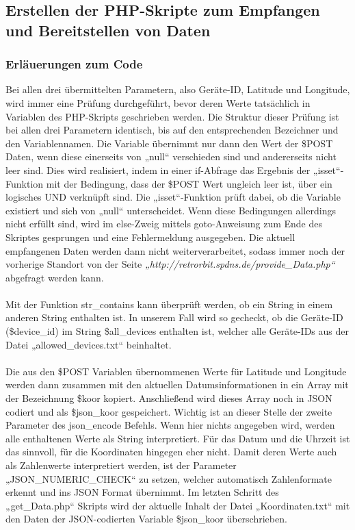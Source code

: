 \subsection{Erstellen der PHP-Skripte zum Empfangen und Bereitstellen von Daten}
\subsubsection{Erläuerungen zum Code }
Bei allen drei übermittelten Parametern, also Geräte-ID, Latitude und Longitude, wird immer eine Prüfung durchgeführt, bevor deren Werte tatsächlich in Variablen des PHP-Skripts geschrieben werden. Die Struktur dieser Prüfung ist bei allen drei Parametern identisch, bis auf den entsprechenden Bezeichner und den Variablennamen.
Die Variable übernimmt nur dann den Wert der \$POST Daten, wenn diese einerseits von „null“ verschieden sind und andererseits nicht leer sind. Dies wird realisiert, indem in einer if-Abfrage das Ergebnis der „isset“-Funktion mit der Bedingung, dass der \$POST Wert ungleich leer ist, über ein logisches UND verknüpft sind. Die „isset“-Funktion prüft dabei, ob die Variable existiert und sich von „null“ unterscheidet. Wenn diese Bedingungen allerdings nicht erfüllt sind, wird im else-Zweig mittels goto-Anweisung zum Ende des Skriptes gesprungen und eine Fehlermeldung ausgegeben. Die aktuell empfangenen Daten werden dann nicht weiterverarbeitet, sodass immer noch der vorherige Standort von der Seite \textit{„http://retrorbit.spdns.de/provide\_Data.php“} abgefragt werden kann.
\\
\\
Mit der Funktion str\_contains kann überprüft werden, ob ein String in einem anderen String enthalten ist. In unserem Fall wird so gecheckt, ob die Geräte-ID (\$device\_id) im String \$all\_devices enthalten ist, welcher alle Geräte-IDs aus der Datei „allowed\_devices.txt“ beinhaltet.
\\
\\
Die aus den \$POST Variablen übernommenen Werte für Latitude und Longitude werden dann zusammen mit den aktuellen Datumsinformationen in ein Array mit der Bezeichnung \$koor kopiert. Anschließend wird dieses Array noch in JSON codiert und als \$json\_koor gespeichert. Wichtig ist an dieser Stelle der zweite Parameter des json\_encode Befehls. Wenn hier nichts angegeben wird, werden alle enthaltenen Werte als String interpretiert. Für das Datum und die Uhrzeit ist das sinnvoll, für die Koordinaten hingegen eher nicht. Damit deren Werte auch als Zahlenwerte interpretiert werden, ist der Parameter „JSON\_NUMERIC\_CHECK“ zu setzen, welcher automatisch Zahlenformate erkennt und ins JSON Format übernimmt. Im letzten Schritt des „get\_Data.php“ Skripts wird der aktuelle Inhalt der Datei „Koordinaten.txt“ mit den Daten der JSON-codierten Variable \$json\_koor überschrieben.
